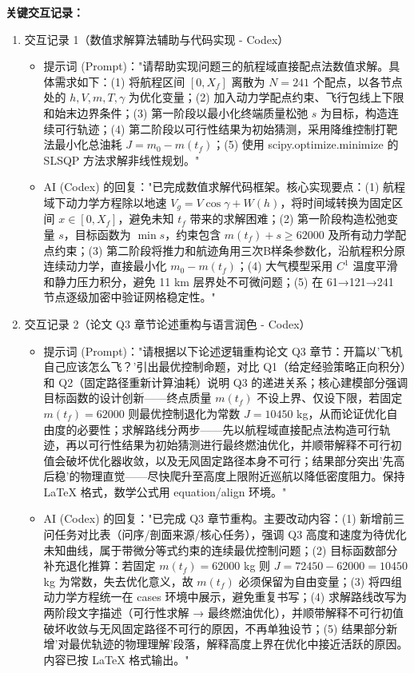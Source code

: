 \documentclass[withoutpreface,bwprint]{cumcmthesis}
\begin{document}
\textbf{关键交互记录：}
\begin{enumerate}[leftmargin=*]
    \item 交互记录 1（数值求解算法辅助与代码实现 - Codex）
    \begin{itemize}
    \item 提示词 (Prompt)："请帮助实现问题三的航程域直接配点法数值求解。具体需求如下：(1) 将航程区间 $[0, X_f]$ 离散为 $N=241$ 个配点，以各节点处的 $h, V, m, T, \gamma$ 为优化变量；(2) 加入动力学配点约束、飞行包线上下限和始末边界条件；(3) 第一阶段以最小化终端质量松弛 $s$ 为目标，构造连续可行轨迹；(4) 第二阶段以可行性结果为初始猜测，采用降维控制打靶法最小化总油耗 $J=m_0-m(t_f)$；(5) 使用 scipy.optimize.minimize 的 SLSQP 方法求解非线性规划。"
    \item AI (Codex) 的回复："已完成数值求解代码框架。核心实现要点：(1) 航程域下动力学方程除以地速 $V_g=V\cos\gamma+W(h)$，将时间域转换为固定区间 $x\in[0,X_f]$，避免未知 $t_f$ 带来的求解困难；(2) 第一阶段构造松弛变量 $s$，目标函数为 $\min s$，约束包含 $m(t_f)+s\geq 62000$ 及所有动力学配点约束；(3) 第二阶段将推力和航迹角用三次B样条参数化，沿航程积分原连续动力学，直接最小化 $m_0-m(t_f)$；(4) 大气模型采用 $C^1$ 温度平滑和静力压力积分，避免 11 km 层界处不可微问题；(5) 在 61→121→241 节点逐级加密中验证网格稳定性。"
    \end{itemize}
    \item 交互记录 2（论文 Q3 章节论述重构与语言润色 - Codex）
    \begin{itemize}
    \item 提示词 (Prompt)："请根据以下论述逻辑重构论文 Q3 章节：开篇以'飞机自己应该怎么飞？'引出最优控制命题，对比 Q1（给定经验策略正向积分）和 Q2（固定路径重新计算油耗）说明 Q3 的递进关系；核心建模部分强调目标函数的设计创新——终点质量 $m(t_f)$ 不设上界、仅设下限，若固定 $m(t_f)=62000$ 则最优控制退化为常数 $J=10450$ kg，从而论证优化自由度的必要性；求解路线分两步——先以航程域直接配点法构造可行轨迹，再以可行性结果为初始猜测进行最终燃油优化，并顺带解释不可行初值会破坏优化器收敛，以及无风固定路径本身不可行；结果部分突出'先高后稳'的物理直觉——尽快爬升至高度上限附近巡航以降低密度阻力。保持 LaTeX 格式，数学公式用 equation/align 环境。"
    \item AI (Codex) 的回复："已完成 Q3 章节重构。主要改动内容：(1) 新增前三问任务对比表（问序/剖面来源/核心任务），强调 Q3 高度和速度为待优化未知曲线，属于带微分等式约束的连续最优控制问题；(2) 目标函数部分补充退化推算：若固定 $m(t_f)=62000$ kg 则 $J=72450-62000=10450$ kg 为常数，失去优化意义，故 $m(t_f)$ 必须保留为自由变量；(3) 将四组动力学方程统一在 cases 环境中展示，避免重复书写；(4) 求解路线改写为两阶段文字描述（可行性求解 → 最终燃油优化），并顺带解释不可行初值破坏收敛与无风固定路径不可行的原因，不再单独设节；(5) 结果部分新增'对最优轨迹的物理理解'段落，解释高度上界在优化中接近活跃的原因。内容已按 LaTeX 格式输出。"

\end{itemize}
\end{enumerate}
\end{document}
